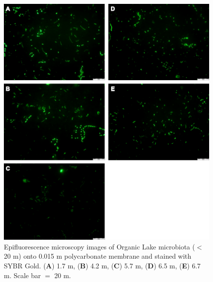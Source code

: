 \begin{figure}
\includegraphics[width=\textwidth]{orglake_figures/microscopy.pdf}
\caption[Epifluorescence microscopy images of Organic Lake microbiota]{Epifluorescence microscopy images of Organic Lake microbiota ($<$20 \textmu{}m) onto 0.015 \textmu{}m polycarbonate membrane and stained with \textsc{SYBR} Gold. (\textbf{A}) 1.7 m, (\textbf{B}) 4.2 m, (\textbf{C}) 5.7 m, (\textbf{D}) 6.5 m, (\textbf{E}) 6.7 m. Scale bar $=$ 20 \textmu{}m. }
\label{fig:microscopy}

\end{figure}
